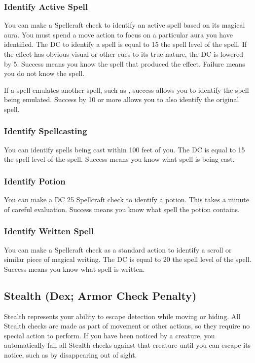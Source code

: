 \subsubsection{Identify Active Spell}
You can make a Spellcraft check to identify an active spell based on its magical aura. You must spend a move action to focus on a particular aura you have identified. The DC to identify a spell is equal to 15 \add the spell level of the spell.  If the effect has obvious visual or other cues to its true nature, the DC is lowered by 5. Success means you know the spell that produced the effect. Failure means you do not know the spell.

If a spell emulates another spell, such as , success allows you to identify the spell being emulated. Success by 10 or more allows you to also identify the original spell. 

\subsubsection{Identify Spellcasting}
You can identify spells being cast within 100 feet of you. The DC is equal to 15 \add the spell level of the spell. Success means you know what spell is being cast.

\subsubsection{Identify Potion}
You can make a DC 25 Spellcraft check to identify a potion. This takes a minute of careful evaluation. Success means you know what spell the potion contains.

\subsubsection{Identify Written Spell}
You can make a Spellcraft check as a standard action to identify a scroll or similar piece of magical writing. The DC is equal to 20 \add the spell level of the spell. Success means you know what spell is written.

\subsection{Stealth (Dex; Armor Check Penalty)}\label{Stealth}
Stealth represents your ability to escape detection while moving or hiding. All Stealth checks are made as part of movement or other actions, so they require no special action to perform. If you have been noticed by a creature, you automatically fail all Stealth checks against that creature until you can escape its notice, such as by disappearing out of sight.

